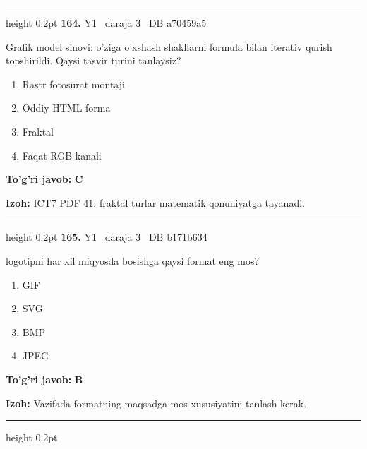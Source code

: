 \documentclass[10pt,a4paper,oneside]{article}
\begin{document}
\vspace{2mm}\hrule height 0.2pt \vspace{4mm}
\hypertarget{q164}{\textbf{\color{ink}164.}}  {\color{muted}\scriptsize Y1 \textbullet\ daraja 3 \textbullet\ DB a70459a5}
\par
Grafik model sinovi: o'ziga o'xshash shakllarni formula bilan iterativ qurish topshirildi. Qaysi tasvir turini tanlaysiz?
\begin{enumerate}[label=\Alph*),leftmargin=9mm]
\item Rastr fotosurat montaji
\item Oddiy HTML forma
\item Fraktal
\item Faqat RGB kanali
\end{enumerate}
\begin{tcolorbox}[enhanced,breakable,colback=teal!4,colframe=teal!45!black,boxrule=0.45pt,arc=1.2mm,left=2.8mm,right=2.8mm,top=2mm,bottom=2mm,before skip=2mm,after skip=2mm]
\textbf{\color{teal}To'g'ri javob:} \textbf{C}
\par\smallskip
\textbf{Izoh:} ICT7 PDF 41: fraktal turlar matematik qonuniyatga tayanadi.
\end{tcolorbox}
\vspace{2mm}\hrule height 0.2pt \vspace{4mm}
\hypertarget{q165}{\textbf{\color{ink}165.}}  {\color{muted}\scriptsize Y1 \textbullet\ daraja 3 \textbullet\ DB b171b634}
\par
logotipni har xil miqyosda bosishga qaysi format eng mos?
\begin{enumerate}[label=\Alph*),leftmargin=9mm]
\item GIF
\item SVG
\item BMP
\item JPEG
\end{enumerate}
\begin{tcolorbox}[enhanced,breakable,colback=teal!4,colframe=teal!45!black,boxrule=0.45pt,arc=1.2mm,left=2.8mm,right=2.8mm,top=2mm,bottom=2mm,before skip=2mm,after skip=2mm]
\textbf{\color{teal}To'g'ri javob:} \textbf{B}
\par\smallskip
\textbf{Izoh:} Vazifada formatning maqsadga mos xususiyatini tanlash kerak.
\end{tcolorbox}
\vspace{2mm}\hrule height 0.2pt \vspace{4mm}
\end{document}
